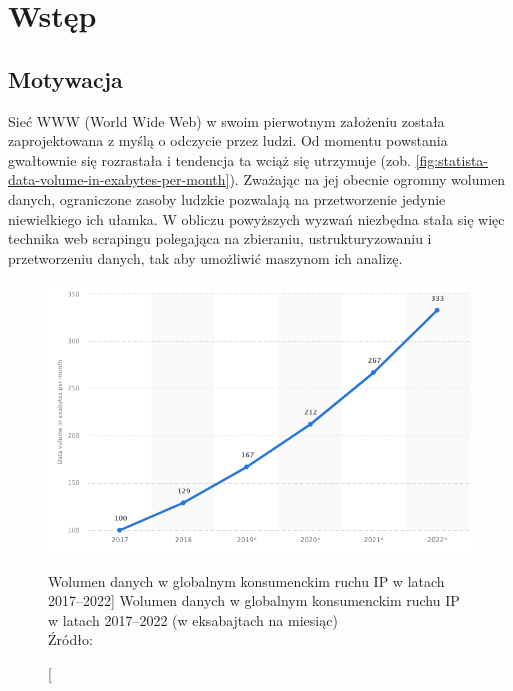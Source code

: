 \newpage


\section{Wstęp}\label{sec:wstep}

\subsection{Motywacja}\label{subsec:motywacja}

Sieć WWW (World Wide Web) w swoim pierwotnym założeniu została zaprojektowana z myślą o odczycie przez ludzi.
Od momentu powstania gwałtownie się rozrastała i tendencja ta wciąż się utrzymuje (zob. \autoref{fig:statista-data-volume-in-exabytes-per-month}).
Zważając na jej obecnie ogromny wolumen danych, ograniczone zasoby ludzkie pozwalają na przetworzenie jedynie niewielkiego ich ułamka.
W obliczu powyższych wyzwań niezbędna stała się więc technika web scrapingu polegająca na zbieraniu, ustrukturyzowaniu i przetworzeniu danych, tak aby umożliwić maszynom ich analizę.

\begin{figure}[H]
    \centering
    \captionsetup{width=.8\linewidth}
    \includegraphics[width=\textwidth]{img/statista-data-volume-in-exabytes-per-month}
    \caption
        [Wolumen danych w globalnym konsumenckim ruchu IP w latach 2017–2022]
        {Wolumen danych w globalnym konsumenckim ruchu IP\\ w latach 2017–2022 (w eksabajtach na miesiąc)\\Źródło: ~\cite{statista-data-volume}}
    \label{fig:statista-data-volume-in-exabytes-per-month}
\end{figure}

